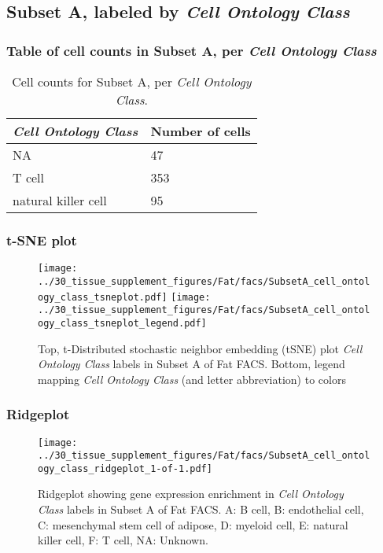 \clearpage

\subsection{Subset A, labeled by \emph{Cell Ontology Class}}
\subsubsection{Table of cell counts in Subset A, per \emph{Cell Ontology Class}}\begin{table}[h]
\centering
\label{my-label}
\begin{tabular}{@{}ll@{}}
\toprule

\emph{Cell Ontology Class}& Number of cells \\ \midrule
NA & 47 \\

T cell & 353 \\

natural killer cell & 95 \\
\bottomrule
\end{tabular}
\caption{Cell counts for Subset A, per \emph{Cell Ontology Class}.}
\end{table}

\clearpage
\subsubsection{t-SNE plot}
\begin{figure}[h]
\centering
\texttt{[image: ../30\_tissue\_supplement\_figures/Fat/facs/SubsetA\_cell\_ontology\_class\_tsneplot.pdf]}
\texttt{[image: ../30\_tissue\_supplement\_figures/Fat/facs/SubsetA\_cell\_ontology\_class\_tsneplot\_legend.pdf]}
\caption{Top, t-Distributed stochastic neighbor embedding (tSNE) plot  \emph{Cell Ontology Class} labels in Subset A of Fat FACS. Bottom, legend mapping \emph{Cell Ontology Class} (and letter abbreviation) to colors}
\end{figure}


\clearpage

\subsubsection{Ridgeplot}
\begin{figure}[h]
\centering
\texttt{[image: ../30\_tissue\_supplement\_figures/Fat/facs/SubsetA\_cell\_ontology\_class\_ridgeplot\_1-of-1.pdf]}

\caption{ Ridgeplot  showing gene expression enrichment in \emph{Cell Ontology Class} labels in Subset A of Fat FACS. A: B cell, B: endothelial cell, C: mesenchymal stem cell of adipose, D: myeloid cell, E: natural killer cell, F: T cell, NA: Unknown.}
\end{figure}


